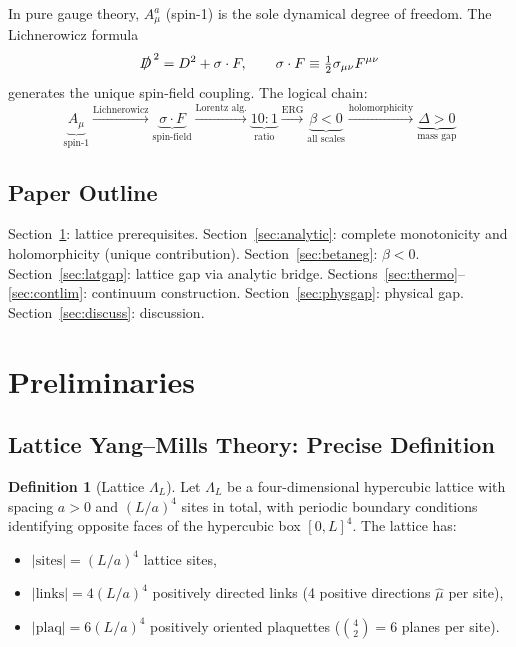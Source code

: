 \documentclass[12pt,a4paper]{article}
\theoremstyle{plain}
\theoremstyle{definition}
\newtheorem{definition}[theorem]{Definition}
\theoremstyle{remark}
\begin{document}
In pure gauge theory, $A_\mu^a$ (spin-1) is the sole dynamical degree of freedom. The Lichnerowicz formula
\begin{equation}\label{eq:Lich}
\slashed{D}^{\,2} = D^2 + \sigma\cdot F, \qquad \sigma\cdot F \equiv \tfrac{1}{2}\sigma_{\mu\nu}F^{\mu\nu}
\end{equation}
generates the unique spin-field coupling. The logical chain:
\begin{equation}\label{eq:chain}
\underbrace{A_\mu}_{\text{spin-1}} \xrightarrow{\text{Lichnerowicz}}
\underbrace{\sigma\cdot F}_{\text{spin-field}} \xrightarrow{\text{Lorentz alg.}}
\underbrace{10{:}1}_{\text{ratio}} \xrightarrow{\text{ERG}}
\underbrace{\beta<0}_{\text{all scales}} \xrightarrow{\text{holomorphicity}}
\underbrace{\Delta>0}_{\text{mass gap}}
\end{equation}

\subsection{Paper Outline}\label{sec:structure}

Section~\ref{sec:prelim}: lattice prerequisites. Section~\ref{sec:analytic}: complete monotonicity and holomorphicity (unique contribution). Section~\ref{sec:betaneg}: $\beta<0$. Section~\ref{sec:latgap}: lattice gap via analytic bridge. Sections~\ref{sec:thermo}--\ref{sec:contlim}: continuum construction. Section~\ref{sec:physgap}: physical gap. Section~\ref{sec:discuss}: discussion.
\section{Preliminaries}\label{sec:prelim}

\subsection{Lattice Yang--Mills Theory: Precise Definition}\label{sec:lattice}

\begin{definition}[Lattice $\Lambda_L$]\label{def:lattice}
Let $\Lambda_L$ be a four-dimensional hypercubic lattice with spacing $a>0$ and $(L/a)^4$ sites in total, with periodic boundary conditions identifying opposite faces of the hypercubic box $[0,L]^4$. The lattice has:
\begin{itemize}[nosep]
\item $|\mathrm{sites}| = (L/a)^4$ lattice sites,
\item $|\mathrm{links}| = 4(L/a)^4$ positively directed links (4 positive directions $\hat\mu$ per site),
\item $|\mathrm{plaq}| = 6(L/a)^4$ positively oriented plaquettes ($\binom{4}{2}=6$ planes per site).
\end{itemize}
\end{definition}
\end{document}
